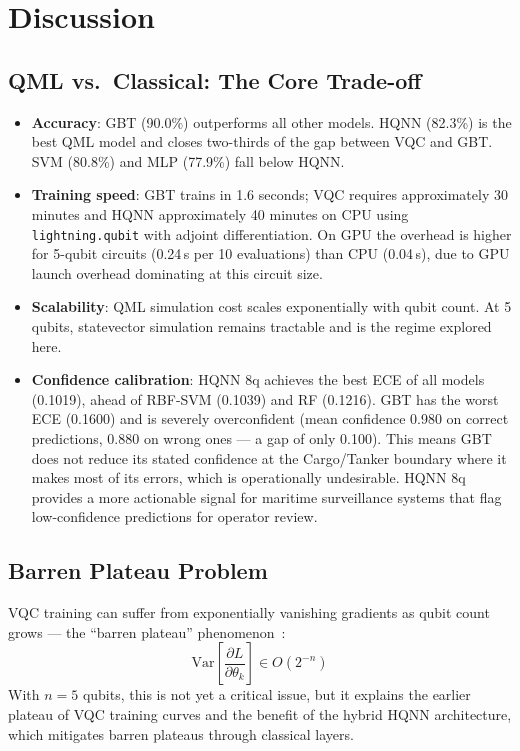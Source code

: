 \documentclass[journal]{IEEEtran}
\begin{document}
\section{Discussion}
\label{sec:discussion}

\subsection{QML vs.\ Classical: The Core Trade-off}

\begin{itemize}
  \item \textbf{Accuracy}: GBT (90.0\%) outperforms all other models.
        HQNN (82.3\%) is the best QML model and closes two-thirds of the
        gap between VQC and GBT. SVM (80.8\%) and MLP (77.9\%) fall below HQNN.
  \item \textbf{Training speed}: GBT trains in 1.6 seconds; VQC requires
        approximately 30 minutes and HQNN approximately 40 minutes on CPU
        using \texttt{lightning.qubit} with adjoint differentiation.
        On GPU the overhead is higher for 5-qubit circuits (0.24\,s per
        10 evaluations) than CPU (0.04\,s), due to GPU launch overhead
        dominating at this circuit size.
  \item \textbf{Scalability}: QML simulation cost scales exponentially with
        qubit count. At 5 qubits, statevector simulation remains tractable
        and is the regime explored here.
  \item \textbf{Confidence calibration}: HQNN 8q achieves the best ECE of all
        models (0.1019), ahead of RBF-SVM (0.1039) and RF (0.1216). GBT has
        the worst ECE (0.1600) and is severely overconfident (mean confidence
        0.980 on correct predictions, 0.880 on wrong ones — a gap of only
        0.100). This means GBT does not reduce its stated confidence at the
        Cargo/Tanker boundary where it makes most of its errors, which is
        operationally undesirable. HQNN 8q provides a more actionable signal
        for maritime surveillance systems that flag low-confidence predictions
        for operator review.
\end{itemize}

\subsection{Barren Plateau Problem}

VQC training can suffer from exponentially vanishing gradients as qubit count
grows — the ``barren plateau'' phenomenon~\cite{mcclean2018barren}:
\begin{equation}
  \text{Var}\!\left[\frac{\partial L}{\partial \theta_k}\right] \in O(2^{-n})
\end{equation}
With $n=5$ qubits, this is not yet a critical issue, but it explains the
earlier plateau of VQC training curves and the benefit of the hybrid HQNN
architecture, which mitigates barren plateaus through classical layers.
\end{document}
